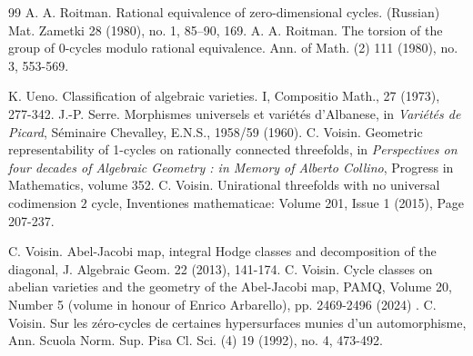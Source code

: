 \documentclass[10pt]{article}
\begin{document}
\begin{thebibliography}{99}
       A. A. Roitman. Rational equivalence of zero-dimensional cycles. (Russian) Mat. Zametki 28 (1980), no. 1, 85–90, 169.
      A. A. Roitman. The torsion of the group of 0-cycles modulo rational equivalence. Ann. of Math. (2) 111 (1980), no. 3, 553-569.

         K. Ueno. Classification of algebraic varieties. I, Compositio Math., 27 (1973),
277-342.
         J.-P. Serre. Morphismes universels et vari\'{e}t\'{e}s d’Albanese, in {\it Vari\'{e}t\'{e}s de Picard},
S\'{e}minaire Chevalley, E.N.S., 1958/59 (1960).
  C. Voisin. Geometric representability of 1-cycles on rationally  connected threefolds,  in {\it  Perspectives on four decades of Algebraic Geometry : in Memory of Alberto Collino}, Progress in Mathematics, volume 352.
  C. Voisin. Unirational threefolds with no universal  codimension $2$ cycle, Inventiones mathematicae: Volume 201, Issue 1 (2015), Page 207-237.

 C. Voisin. Abel-Jacobi map, integral Hodge classes and decomposition of the diagonal,
J. Algebraic Geom. 22 (2013), 141-174.
 C. Voisin.  Cycle classes on abelian varieties and the geometry of the Abel-Jacobi map,  PAMQ, Volume 20, Number 5  (volume in honour of Enrico Arbarello), pp. 2469-2496 (2024) .
 C. Voisin. Sur les zéro-cycles de certaines hypersurfaces munies d'un automorphisme,
Ann. Scuola Norm. Sup. Pisa Cl. Sci. (4) 19 (1992), no. 4, 473-492.
\end{thebibliography}
\end{document}
